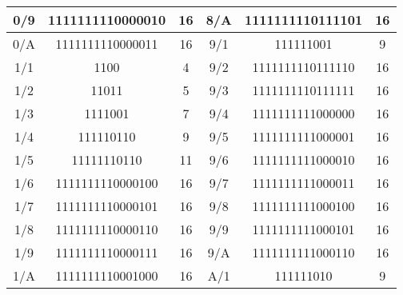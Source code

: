 \begin{table}[!ht]
\begin{tabular}{|c|c|c|c|c|c|}
0/9                                                        & 1111111110000010 & 16      & 8/A                                                        & 1111111110111101 & 16      \\ \hline
0/A                                                        & 1111111110000011 & 16      & 9/1                                                        & 111111001        & 9       \\ \hline
1/1                                                        & 1100             & 4       & 9/2                                                        & 1111111110111110 & 16      \\ \hline
1/2                                                        & 11011            & 5       & 9/3                                                        & 1111111110111111 & 16      \\ \hline
1/3                                                        & 1111001          & 7       & 9/4                                                        & 1111111111000000 & 16      \\ \hline
1/4                                                        & 111110110        & 9       & 9/5                                                        & 1111111111000001 & 16      \\ \hline
1/5                                                        & 11111110110      & 11      & 9/6                                                        & 1111111111000010 & 16      \\ \hline
1/6                                                        & 1111111110000100 & 16      & 9/7                                                        & 1111111111000011 & 16      \\ \hline
1/7                                                        & 1111111110000101 & 16      & 9/8                                                        & 1111111111000100 & 16      \\ \hline
1/8                                                        & 1111111110000110 & 16      & 9/9                                                        & 1111111111000101 & 16      \\ \hline
1/9                                                        & 1111111110000111 & 16      & 9/A                                                        & 1111111111000110 & 16      \\ \hline
1/A                                                        & 1111111110001000 & 16      & A/1                                                        & 111111010        & 9       \\ \hline

\end{tabular}
\end{table}
